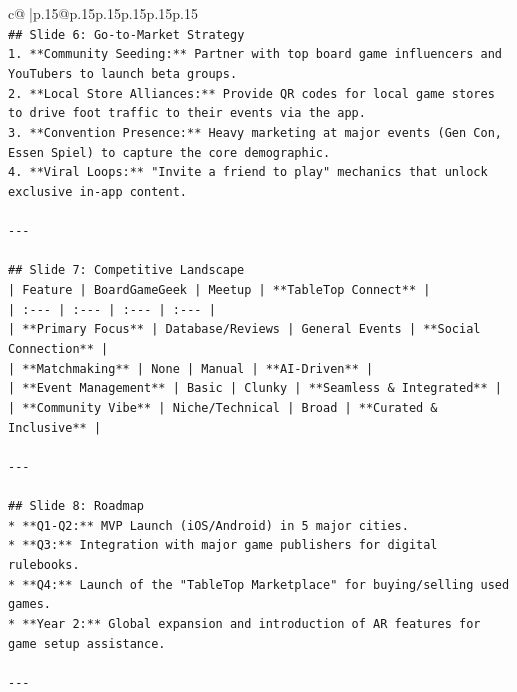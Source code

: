 \documentclass{article}
\begin{document}
{\begin{supertabular}{c@{$\;$}|p{.15\linewidth}@{}p{.15\linewidth}p{.15\linewidth}p{.15\linewidth}p{.15\linewidth}p{.15\linewidth}}
{{{\\ 
\texttt{\#\# Slide 6: Go{-}to{-}Market Strategy} \\
\texttt{1.  **Community Seeding:** Partner with top board game influencers and YouTubers to launch beta groups.} \\
\texttt{2.  **Local Store Alliances:** Provide QR codes for local game stores to drive foot traffic to their events via the app.} \\
\texttt{3.  **Convention Presence:** Heavy marketing at major events (Gen Con, Essen Spiel) to capture the core demographic.} \\
\texttt{4.  **Viral Loops:** "Invite a friend to play" mechanics that unlock exclusive in{-}app content.} \\
\\ 
\texttt{{-}{-}{-}} \\
\\ 
\texttt{\#\# Slide 7: Competitive Landscape} \\
\texttt{| Feature | BoardGameGeek | Meetup | **TableTop Connect** |} \\
\texttt{| :{-}{-}{-} | :{-}{-}{-} | :{-}{-}{-} | :{-}{-}{-} |} \\
\texttt{| **Primary Focus** | Database/Reviews | General Events | **Social Connection** |} \\
\texttt{| **Matchmaking** | None | Manual | **AI{-}Driven** |} \\
\texttt{| **Event Management** | Basic | Clunky | **Seamless \& Integrated** |} \\
\texttt{| **Community Vibe** | Niche/Technical | Broad | **Curated \& Inclusive** |} \\
\\ 
\texttt{{-}{-}{-}} \\
\\ 
\texttt{\#\# Slide 8: Roadmap} \\
\texttt{*   **Q1{-}Q2:** MVP Launch (iOS/Android) in 5 major cities.} \\
\texttt{*   **Q3:** Integration with major game publishers for digital rulebooks.} \\
\texttt{*   **Q4:** Launch of the "TableTop Marketplace" for buying/selling used games.} \\
\texttt{*   **Year 2:** Global expansion and introduction of AR features for game setup assistance.} \\
\\ 
\texttt{{-}{-}{-}} \\
\\ 
}}}
\end{supertabular}}
\end{document}

